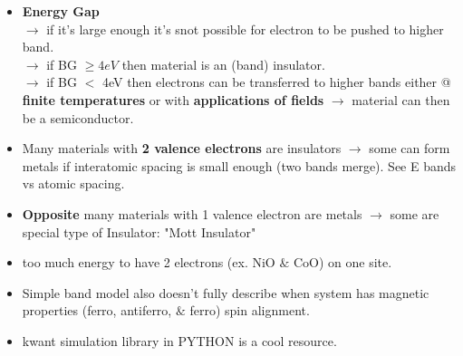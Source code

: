 \begin{itemize}
    \item \textbf{Energy Gap} \\
    $\rightarrow$ if it's large enough it's snot possible for electron to be pushed to higher band.\\
    $\rightarrow$ if BG $\ge 4eV$ then material is an (band) insulator.\\
    $\rightarrow$ if BG $<$ 4eV then electrons can be transferred to higher bands either @ \textbf{finite temperatures} or with \textbf{applications of fields} $\rightarrow$ material can then be a semiconductor.
    \item Many materials with \textbf{2 valence electrons} are insulators $\rightarrow$ some can form metals if interatomic spacing is small enough (two bands merge). See E bands vs atomic spacing.
    \item \textbf{Opposite} many materials with 1 valence electron are metals $\rightarrow$ some are special type of Insulator: "Mott Insulator"
    \item too much energy to have 2 electrons (ex. NiO $\&$ CoO) on one site.
    \item Simple band model also doesn't fully describe when system has magnetic properties (ferro, antiferro, $\&$ ferro) spin alignment.
    \item kwant simulation library in PYTHON is a cool resource.
 \end{itemize}
